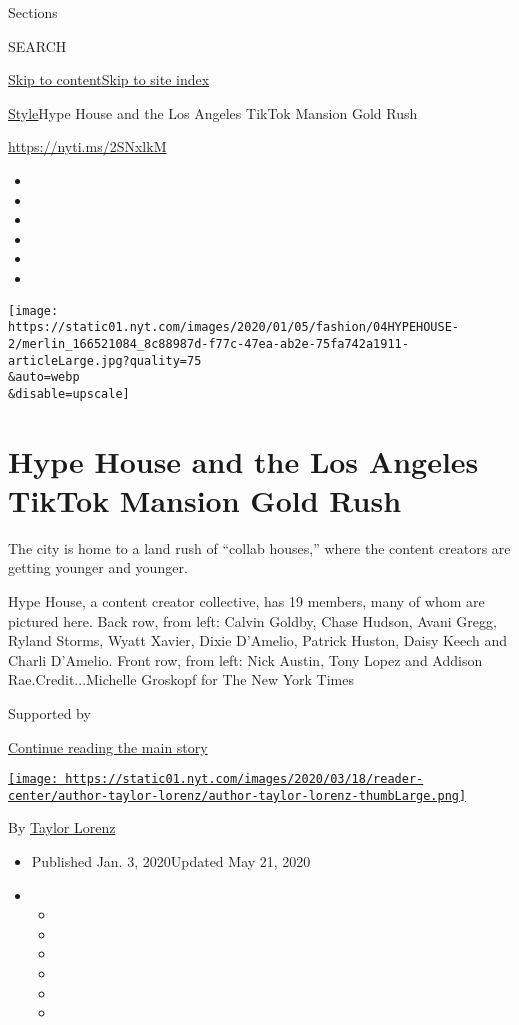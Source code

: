 Sections

SEARCH

\protect\hyperlink{site-content}{Skip to
content}\protect\hyperlink{site-index}{Skip to site index}

\href{/section/style}{Style}\textbar{}Hype House and the Los Angeles
TikTok Mansion Gold Rush

\url{https://nyti.ms/2SNxlkM}

\begin{itemize}
\item
\item
\item
\item
\item
\item
\end{itemize}

\texttt{[image: https://static01.nyt.com/images/2020/01/05/fashion/04HYPEHOUSE-2/merlin\_166521084\_8c88987d-f77c-47ea-ab2e-75fa742a1911-articleLarge.jpg?quality=75\\\&auto=webp\\\&disable=upscale]}

\hypertarget{hype-house-and-the-los-angeles-tiktok-mansion-gold-rush}{%
\section{Hype House and the Los Angeles TikTok Mansion Gold
Rush}\label{hype-house-and-the-los-angeles-tiktok-mansion-gold-rush}}

The city is home to a land rush of ``collab houses,'' where the content
creators are getting younger and younger.

Hype House, a content creator collective, has 19 members, many of whom
are pictured here. Back row, from left: Calvin Goldby, Chase Hudson,
Avani Gregg, Ryland Storms, Wyatt Xavier, Dixie D'Amelio, Patrick
Huston, Daisy Keech and Charli D'Amelio. Front row, from left: Nick
Austin, Tony Lopez and Addison Rae.Credit...Michelle Groskopf for The
New York Times

Supported by

\protect\hyperlink{after-sponsor}{Continue reading the main story}

\href{https://www.nytimes.com/by/taylor-lorenz}{\texttt{[image: https://static01.nyt.com/images/2020/03/18/reader-center/author-taylor-lorenz/author-taylor-lorenz-thumbLarge.png]}}

By \href{https://www.nytimes.com/by/taylor-lorenz}{Taylor Lorenz}

\begin{itemize}
\item
  Published Jan. 3, 2020Updated May 21, 2020
\item
  \begin{itemize}
  \item
  \item
  \item
  \item
  \item
  \item
  \end{itemize}
\end{itemize}

